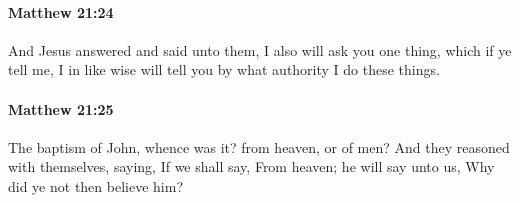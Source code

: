 		\paragraph{Matthew 21:24} %
			\label{MATTHEW-21-24}

			And Jesus answered and said unto them, I also will ask you one thing, which if ye tell me, I in like wise will tell you by what authority I do these things.

			\begin{framed}
			\scriptsize
				\begin{compactdesc}
					\item[SBLG] 
				\end{compactdesc}
			\end{framed}

		\paragraph{Matthew 21:25} %
			\label{MATTHEW-21-25}

			The baptism of John, whence was it? from heaven, or of men? And they reasoned with themselves, saying, If we shall say, From heaven; he will say unto us, Why did ye not then believe him?

